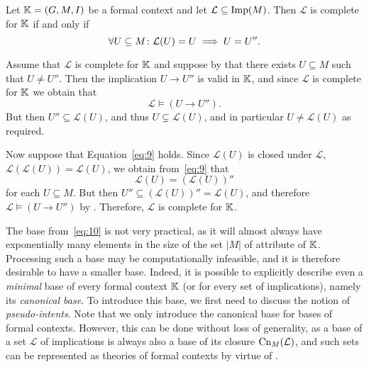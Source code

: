 \begin{Lemma}
  \label{lem:characterization-of-completeness}
  Let ${\mathbb{K}} = (G, M, I)$ be a formal context and let $\mathcal{L} \subseteq \operatorname{Imp}(M)$.
  Then $\mathcal{L}$ is complete for ${\mathbb{K}}$ if and only if
  \begin{equation}
    \label{eq:9}
    \forall U \subseteq M \colon \mathcal{L}(U) = U \implies U = U''.
  \end{equation}
\end{Lemma}
\begin{Proof}
  Assume that $\mathcal{L}$ is complete for ${\mathbb{K}}$ and suppose by that there exists $U
  \subseteq M$ such that $U \neq U''$.  Then the implication $U \to U''$ is valid in ${\mathbb{K}}$, and since $\mathcal{L}$ is complete for ${\mathbb{K}}$ we obtain that
  \begin{equation*}
    \mathcal{L} \models (U \to U'').
  \end{equation*}
  But then $U'' \subseteq \mathcal{L}(U)$, and thus $U \subsetneq \mathcal{L}(U)$, and in
  particular $U \neq \mathcal{L}(U)$ as required.

  Now suppose that Equation~\eqref{eq:9} holds.  Since $\mathcal{L}(U)$ is closed under
  $\mathcal{L}$, \ie $\mathcal{L}(\mathcal{L}(U)) = \mathcal{L}(U)$, we obtain
  from~\eqref{eq:9} that
  \begin{equation*}
    \mathcal{L}(U) = (\mathcal{L}(U))''
  \end{equation*}
  for each $U \subseteq M$.  But then $U'' \subseteq (\mathcal{L}(U))'' = \mathcal{L}(U)$,
  and therefore $\mathcal{L} \models (U \to U'')$ by
  .
  Therefore, $\mathcal{L}$ is complete for ${\mathbb{K}}$.
\end{Proof}

The base from~\eqref{eq:10} is not very practical, as it will almost always have
exponentially many elements in the size of the set $|M|$ of attribute of ${\mathbb{K}}$.
Processing such a base may be computationally infeasible, and it is therefore desirable to
have a smaller base.  Indeed, it is possible to explicitly describe even a \emph{minimal}
base of every formal context ${\mathbb{K}}$ (or for every set of implications), namely its
\emph{canonical base}.  To introduce this base, we first need to discuss the notion of
\emph{pseudo-intents}.  Note that we only introduce the canonical base for bases of formal
contexts.  However, this can be done without loss of generality, as a base of a set
$\mathcal{L}$ of implications is always also a base of its closure $\operatorname{Cn}_M(\mathcal{L})$,
and such sets can be represented as theories of formal contexts by virtue of
.

